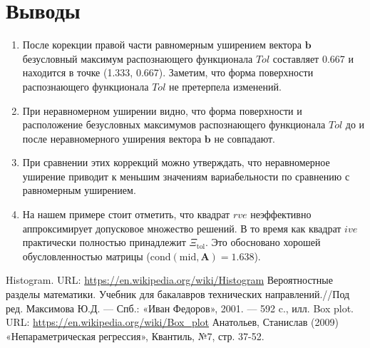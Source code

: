 \documentclass[a4paper,14pt]{article}
\begin{document}
	\section{Выводы}
	\begin{enumerate}
		\item После корекции правой части равномерным уширением вектора $\textbf{b}$ безусловный максимум распознающего функционала $Tol$ составляет 0.667 и находится в точке (1.333, 0.667). Заметим, что форма поверхности распознающего функционала $Tol$ не претерпела изменений.
		\item При неравномерном уширении видно, что форма поверхности и расположение безусловных максимумов распознающего функционала $Tol$ до и после неравномерного уширения вектора $\textbf{b}$ не совпадают.
		\item При сравнении этих коррекций можно утверждать, что неравномерное уширение приводит к меньшим значениям вариабельности по сравнению с равномерным уширением.
		\item На нашем примере стоит отметить, что квадрат $rve$ неэффективно аппроксимирует допусковое множество решений. В то время как квадрат $ive$ практически полностью принадлежит $\Xi_{\mathrm{tol}}$. Это обосновано хорошей обусловленностью матрицы ($\mathrm{cond}(\mathrm{mid},\mathbf{A})=1.638$).
	\end{enumerate}
	
	\newpage
	
	\begin{thebibliography}{4}
		Histogram. URL: \url{https://en.wikipedia.org/wiki/Histogram}
		Вероятностные разделы математики. Учебник для бакалавров технических направлений.//Под ред. Максимова Ю.Д. --- Спб.: «Иван Федоров», 2001. --- 592 c., илл.
		Box plot. URL: \url{https://en.wikipedia.org/wiki/Box_plot}
		Анатольев, Станислав (2009) «Непараметрическая регрессия», Квантиль, №7, стр. 37-52.
	\end{thebibliography}
	
\end{document}
